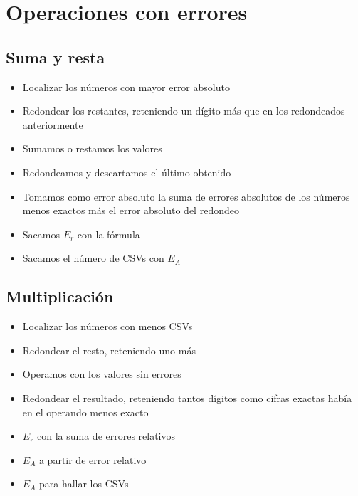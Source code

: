 \documentclass{article}
\begin{document}
\section{Operaciones con errores}
\subsection{Suma y resta}
\begin{itemize}
    \item Localizar los números con mayor error absoluto
    \item Redondear los restantes, reteniendo un dígito más que en los redondeados anteriormente
    \item Sumamos o restamos los valores
    \item Redondeamos y descartamos el último obtenido
    \item Tomamos como error absoluto la suma de errores absolutos de los números menos exactos
    más el error absoluto del redondeo
    \item Sacamos $E_{r}$ con la fórmula
    \item Sacamos el número de CSVs con $E_{A}$
\end{itemize}
\subsection{Multiplicación}
\begin{itemize}
    \item Localizar los números con menos CSVs
    \item Redondear el resto, reteniendo uno más
    \item Operamos con los valores sin errores
    \item Redondear el resultado, reteniendo tantos dígitos como cifras exactas había en el
    operando menos exacto
    \item $E_{r}$ con la suma de errores relativos
    \item $E_{A}$ a partir de error relativo
    \item $E_{A}$ para hallar los CSVs
\end{itemize}
\end{document}
